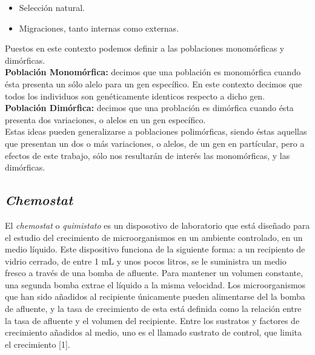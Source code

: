 \documentclass[letterpaper]{article}
\begin{document}
{{\begin{itemize}
{                    \normalsize{Presencia de mutaciones.}
                
                }

                \item {

                    \normalsize{Selección natural.}
                
                }
                
                \item {

                    \normalsize{Migraciones, tanto internas como externas.}
                
                }
            \end{itemize}

            \normalsize{Puestos en este contexto podemos definir a las poblaciones monomórficas y dimórficas.}\\

            \normalsize{\textbf{Población Monomórfica:} decimos que una población es monomórfica cuando ésta presenta un sólo alelo para un gen específico. En este contexto decimos que todos los individuos son genéticamente identicos respecto a dicho gen.}\\

            \normalsize{\textbf{Población Dimórfica:} decimos que una problación es dimórfica cuando ésta presenta dos variaciones, o alelos en un gen específico.}\\

            \normalsize{Estas ideas pueden generalizarse a poblaciones polimórficas, siendo éstas aquellas que presentan un dos o más variaciones, o alelos, de un gen en partícular, pero a efectos de este trabajo, sólo nos resultarán de interés las monomórficas, y las dimórficas.}
        
        }

        \subsection{\textit{Chemostat}}{

            \normalsize{El \textit{chemostat} o \textit{quimistato} es un disposotivo de laboratorio que está diseñado para el estudio del crecimiento de microorganismos en un ambiente controlado, en un medio líquido. Este dispositivo funciona de la siguiente forma: a un recipiento de vidrio cerrado, de entre 1 mL y unos pocos litros, se le suministra un medio fresco a través de una bomba de afluente. Para mantener un volumen constante, una segunda bomba extrae el líquido a la misma velocidad. Los microorganismos que han sido añadidos al recipiente únicamente pueden alimentarse del la bomba de afluente, y la tasa de crecimiento de esta está definida como la relación entre la tasa de afluente y el volumen del recipiente. Entre los sustratos y factores de crecimiento añadidos al medio, uno es el llamado sustrato de control, que limita el crecimiento [1].}

}}
\end{document}
